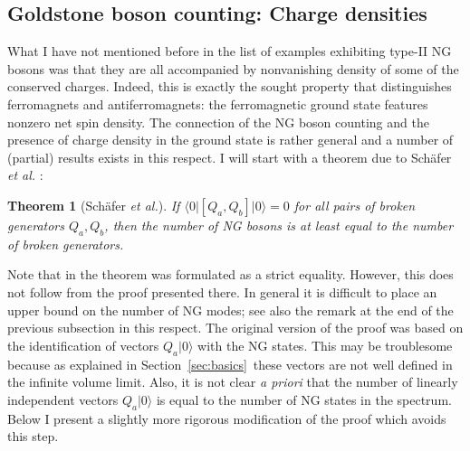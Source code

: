 \documentclass[final,3p,times,12pt,a4paper,sort&compress]{elsarticle}
\newcommand\bra[1]{\langle#1\vert}          %
\newcommand\ket[1]{\vert#1\rangle}          %
\newcommand\thname{Theorem}
\newtheorem{theorem}{\thname}
\begin{document}
\subsection{Goldstone boson counting: Charge densities}
\label{subsec:charge_densities}
What I have not mentioned before in the list of examples exhibiting type-II NG
bosons was that they are all accompanied by nonvanishing density of some of the
conserved charges. Indeed, this is exactly the sought property that
distinguishes ferromagnets and antiferromagnets: the ferromagnetic ground state
features nonzero net spin density. The connection of the NG boson counting and
the presence of charge density in the ground state is rather general and a
number of (partial) results exists in this respect. I will start with a theorem
due to Sch\"afer \emph{et al.} \cite{Schafer:2001bq}:
\begin{theorem}[Sch\"afer \emph{et al.}]
\label{thm:schafer}
If $\bra0[Q_a,Q_b]\ket0=0$ for all pairs of broken generators $Q_a,Q_b$, then
the number of NG bosons is at least equal to the number of broken generators.
\end{theorem}
Note that in \cite{Schafer:2001bq} the theorem was formulated as a strict
equality. However, this does not follow from the proof presented there. In
general it is difficult to place an upper bound on the number of NG modes; see
also the remark at the end of the previous subsection in this respect. The
original version of the proof was based on the identification of vectors
$Q_a\ket0$ with the NG states. This may be troublesome because as explained in
Section~\ref{sec:basics}\ these vectors are not well defined in the infinite
volume limit. Also, it is not clear \emph{a priori} that the number of linearly
independent vectors $Q_a\ket0$ is equal to the number of NG states in the
spectrum. Below I present a slightly more rigorous modification of the proof
which avoids this step.
\end{document}
